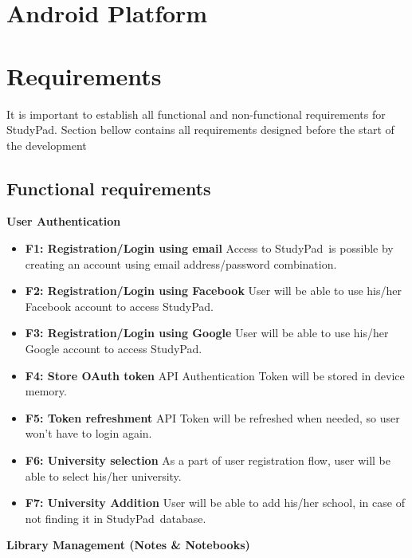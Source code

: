\documentclass[thesis=B,english]{FITthesis}[2012/10/20]
\newcommand{\appname}{StudyPad}
\begin{document}
\section{Android Platform}




\newpage
\section{Requirements}
It is important to establish all functional and non-functional requirements for \appname. Section bellow contains all requirements designed before the start
of the development

\subsection{Functional requirements}
\bigskip
\textbf{User Authentication}
\begin{itemize}
	\item \textbf{F1: Registration/Login using email} Access to \appname\ is possible by creating an account using email address/password combination.
	\item \textbf{F2: Registration/Login using Facebook} User will be able to use his/her Facebook account to access \appname.
	\item \textbf{F3: Registration/Login using Google} User will be able to use his/her Google account to access \appname.
	\item \textbf{F4: Store OAuth token} API Authentication Token will be stored in device memory.
	\item \textbf{F5: Token refreshment} API Token will be refreshed when needed, so user won't have to login again.
	\item \textbf{F6: University selection} As a part of user registration flow, user will be able to select his/her university.
	\item \textbf{F7: University Addition} User will be able to add his/her school, in case of not finding it in \appname\ database.
\end{itemize}
\bigskip
\textbf{Library Management (Notes \& Notebooks)}
\end{document}
